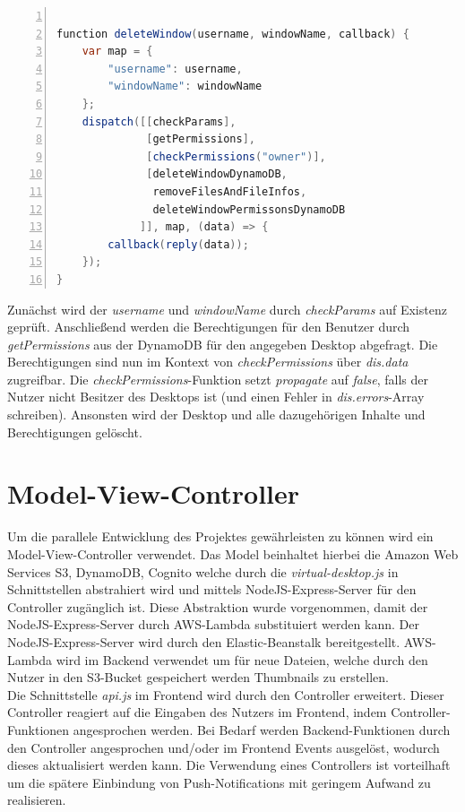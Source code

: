 \documentclass[a4paper, 12pt]{scrreprt}
\renewcommand\_{\textunderscore\allowbreak}
\begin{document}
\begin{lstlisting}[xleftmargin=\parindent,numbers=left,numberstyle=\small,numbersep=8pt,frame=L,mathescape=true, basicstyle=\small, language=Java]

function deleteWindow(username, windowName, callback) {
    var map = { 
        "username": username, 
        "windowName": windowName
    };
    dispatch([[checkParams], 
              [getPermissions], 
              [checkPermissions("owner")], 
              [deleteWindowDynamoDB, 
               removeFilesAndFileInfos, 
               deleteWindowPermissonsDynamoDB
             ]], map, (data) => {
        callback(reply(data));
    });
}
\end{lstlisting}

\noindent Zunächst wird der \textit{username} und \textit{windowName} durch \textit{checkParams} auf Existenz geprüft. Anschließend werden die Berechtigungen für den Benutzer durch \textit{getPermissions} aus der DynamoDB für den angegeben Desktop abgefragt. Die Berechtigungen sind nun im Kontext von \textit{checkPermissions} über \textit{dis.data} zugreifbar. Die \textit{checkPermissions}-Funktion setzt \textit{propagate} auf \textit{false}, falls der Nutzer nicht Besitzer des Desktops ist (und einen Fehler in \textit{dis.errors}-Array schreiben). Ansonsten wird der Desktop und alle dazugehörigen Inhalte und Berechtigungen gelöscht.    

\section{Model-View-Controller}
Um die parallele Entwicklung des Projektes gewährleisten zu können wird ein Model-View-Controller verwendet. Das Model beinhaltet hierbei die Amazon Web Services S3, DynamoDB, Cognito welche durch die \textit{virtual-desktop.js} in Schnittstellen abstrahiert wird und mittels NodeJS-Express-Server für den Controller zugänglich ist. Diese Abstraktion wurde vorgenommen, damit der NodeJS-Express-Server durch AWS-Lambda substituiert werden kann. Der NodeJS-Express-Server wird durch den Elastic-Beanstalk bereitgestellt. AWS-Lambda wird im Backend verwendet um für neue Dateien, welche durch den Nutzer in den S3-Bucket gespeichert werden Thumbnails zu erstellen.\\
Die Schnittstelle \textit{api.js} im Frontend wird durch den Controller erweitert. Dieser Controller reagiert auf die Eingaben des Nutzers im Frontend, indem Controller-Funktionen angesprochen werden. Bei Bedarf werden Backend-Funktionen durch den Controller angesprochen und/oder im Frontend Events ausgelöst, wodurch dieses aktualisiert werden kann.
Die Verwendung eines Controllers ist vorteilhaft um die spätere Einbindung von Push-Notifications mit geringem Aufwand zu realisieren.
\end{document}
